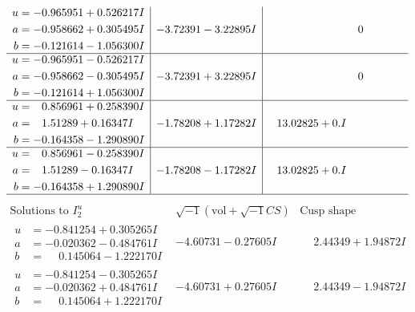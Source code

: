 \documentclass[1p]{elsarticle_modified}
\theoremstyle{definition}
\newcommand{\I}{\sqrt{-1}}
\begin{document}
$$\begin{array}{c|c|c}
\begin{aligned}
u &= -0.965951 + 0.526217 I \\
a &= -0.958662 + 0.305495 I \\
b &= -0.121614 - 1.056300 I\end{aligned}
 & -3.72391 - 3.22895 I & \phantom{-0.000000 } 0 \\ \hline\begin{aligned}
u &= -0.965951 - 0.526217 I \\
a &= -0.958662 - 0.305495 I \\
b &= -0.121614 + 1.056300 I\end{aligned}
 & -3.72391 + 3.22895 I & \phantom{-0.000000 } 0 \\ \hline\begin{aligned}
u &= \phantom{-}0.856961 + 0.258390 I \\
a &= \phantom{-}1.51289 + 0.16347 I \\
b &= -0.164358 - 1.290890 I\end{aligned}
 & -1.78208 + 1.17282 I & \phantom{-}13.02825 + 0. I\phantom{ +0.000000I} \\ \hline\begin{aligned}
u &= \phantom{-}0.856961 - 0.258390 I \\
a &= \phantom{-}1.51289 - 0.16347 I \\
b &= -0.164358 + 1.290890 I\end{aligned}
 & -1.78208 - 1.17282 I & \phantom{-}13.02825 + 0. I\phantom{ +0.000000I}\\
 \hline 
 \end{array}$$\newpage$$\begin{array}{c|c|c}  
\text{Solutions to }I^u_{2}& \I (\text{vol} + \sqrt{-1}CS) & \text{Cusp shape}\\
 \hline 
\begin{aligned}
u &= -0.841254 + 0.305265 I \\
a &= -0.020362 - 0.484761 I \\
b &= \phantom{-}0.145064 - 1.222170 I\end{aligned}
 & -4.60731 - 0.27605 I & \phantom{-}2.44349 + 1.94872 I \\ \hline\begin{aligned}
u &= -0.841254 - 0.305265 I \\
a &= -0.020362 + 0.484761 I \\
b &= \phantom{-}0.145064 + 1.222170 I\end{aligned}
 & -4.60731 + 0.27605 I & \phantom{-}2.44349 - 1.94872 I \\ \hline\begin{aligned}

\end{aligned}
\end{array}$$
\end{document}
